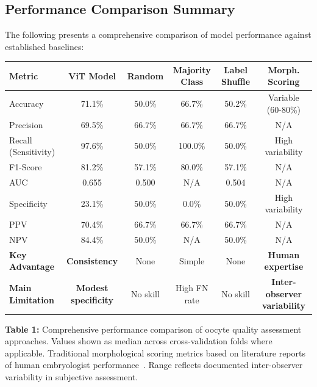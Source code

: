 \subsection{Performance Comparison Summary}

The following presents a comprehensive comparison of model performance against established baselines:

\begin{center}
\small
\begin{tabular}{lccccc}
\hline
\textbf{Metric} & \textbf{ViT Model} & \textbf{Random} & \textbf{Majority Class} & \textbf{Label Shuffle} & \textbf{Morph. Scoring} \\
\hline
Accuracy & 71.1\% & 50.0\% & 66.7\% & 50.2\% & Variable (60-80\%) \\
Precision & 69.5\% & 66.7\% & 66.7\% & 66.7\% & N/A \\
Recall (Sensitivity) & 97.6\% & 50.0\% & 100.0\% & 50.0\% & High variability \\
F1-Score & 81.2\% & 57.1\% & 80.0\% & 57.1\% & N/A \\
AUC & 0.655 & 0.500 & N/A & 0.504 & N/A \\
Specificity & 23.1\% & 50.0\% & 0.0\% & 50.0\% & High variability \\
PPV & 70.4\% & 66.7\% & 66.7\% & 66.7\% & N/A \\
NPV & 84.4\% & 50.0\% & N/A & 50.0\% & N/A \\
\hline
\textbf{Key Advantage} & \textbf{Consistency} & None & Simple & None & \textbf{Human expertise} \\
\textbf{Main Limitation} & \textbf{Modest specificity} & No skill & High FN rate & No skill & \textbf{Inter-observer variability} \\
\hline
\end{tabular}
\end{center}

\textbf{Table 1:} Comprehensive performance comparison of oocyte quality assessment approaches. Values shown as median across cross-validation folds where applicable. Traditional morphological scoring metrics based on literature reports of human embryologist performance~\cite{paternot2009observer,paternot2011multicentre,fordham2022embryologist}. Range reflects documented inter-observer variability in subjective assessment. 